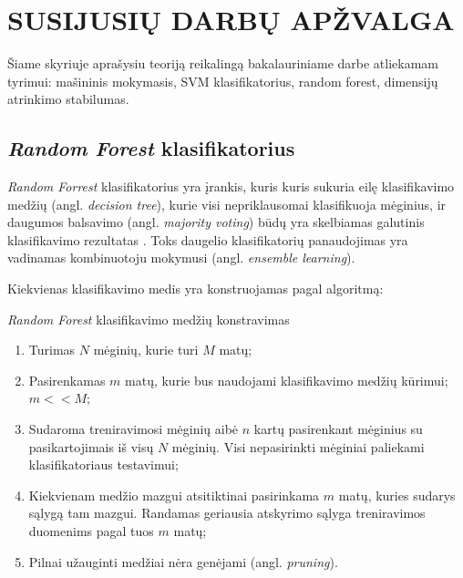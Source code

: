 \section{SUSIJUSIŲ DARBŲ APŽVALGA}
\label{darbu_apzvalga}

Šiame skyriuje aprašysiu teoriją reikalingą bakalauriniame darbe atliekamam tyrimui: mašininis mokymasis, SVM klasifikatorius, random forest, dimensijų atrinkimo stabilumas.





\subsection{\textit{Random Forest} klasifikatorius}

\textit{Random Forrest} klasifikatorius yra įrankis, kuris kuris sukuria eilę klasifikavimo medžių (angl. \textit{decision tree}), kurie visi nepriklausomai klasifikuoja mėginius, ir daugumos balsavimo (angl. \textit{majority voting}) būdų yra skelbiamas galutinis klasifikavimo rezultatas \cite{breiman1984classification}. Toks daugelio klasifikatorių panaudojimas yra vadinamas kombinuotoju mokymusi (angl. \textit{ensemble learning}). 

Kiekvienas klasifikavimo medis yra konstruojamas pagal algoritmą:

\begin{algorithm}
 \caption{\textit{Random Forest} klasifikavimo medžių konstravimas}
 \label{random_forest_algorithm}
 \begin{enumerate}
  \item Turimas $N$ mėginių, kurie turi $M$ matų;
  \item Pasirenkamas $m$ matų, kurie bus naudojami klasifikavimo medžių kūrimui; $m << M$;
  \item Sudaroma treniravimosi mėginių aibė $n$ kartų pasirenkant mėginius su pasikartojimais iš visų $N$ mėginių. Visi nepasirinkti mėginiai paliekami klasifikatoriaus testavimui; 
  \item Kiekvienam medžio mazgui atsitiktinai pasirinkama $m$ matų, kuries sudarys sąlygą tam mazgui. Randamas geriausia atskyrimo sąlyga treniravimos duomenims pagal tuos $m$ matų;
  \item Pilnai užauginti medžiai nėra genėjami (angl. \textit{pruning}).
 \end{enumerate}
\end{algorithm}

